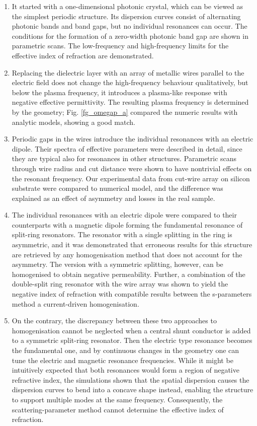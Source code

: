 \begin{enumerate}
\item{It started with a one-dimensional photonic crystal, which can be viewed as the simplest periodic structure. Its dispersion curves consist of alternating photonic bands and band gaps, but no individual resonances can occur. The conditions for the formation of a zero-width photonic band gap are shown in parametric scans. The low-frequency and high-frequency limits for the effective index of refraction are demonstrated.
} 
\item{Replacing the dielectric layer with an array of metallic wires parallel to the electric field does not change the high-frequency behaviour qualitatively, but below the plasma frequency, it introduces a plasma-like response with negative effective permittivity. The resulting plasma frequency is determined by the geometry; Fig. \ref{fg_omegap_a} compared the numeric results with analytic models, showing a good match.
} 
\item{Periodic gaps in the wires introduce the individual resonances with an electric dipole. Their spectra of effective parameters were described in detail, since they are typical also for resonances in other structures. Parametric scans through wire radius and cut distance were shown to have nontrivial effects on the resonant frequency. Our experimental data from cut-wire array on silicon substrate were compared to numerical model, and the difference was explained as an effect of asymmetry and losses in the real sample. 
} 
\item{The individual resonances with an electric dipole were compared to their counterparts with a magnetic dipole forming the fundamental resonance of split-ring resonators. The resonator with a single splitting in the ring is asymmetric, and it was demonstrated that  erroneous results for this structure are retrieved by any homogenisation method that does not account for the asymmetry. The version with a symmetric splitting, however, can be homogenised to obtain negative permeability. Further, a combination of the double-split ring resonator with the wire array was shown to yield the negative index of refraction with compatible results between the s-parameters method a current-driven homogenisation.
} 
\item{On the contrary, the discrepancy between these two approaches to homogenisation cannot be neglected when a central shunt conductor is added to a symmetric split-ring resonator. Then the electric type resonance becomes the fundamental one, and by continuous changes in the geometry one can tune the electric and magnetic resonance frequencies. While it might be intuitively expected that both resonances would form a region of negative refractive index, the simulations shown that the spatial dispersion causes the dispersion curves to bend into a concave shape instead, enabling the structure to support multiple modes at the same frequency. Consequently, the scattering-parameter method cannot determine the effective index of refraction.
}
\end{enumerate}
